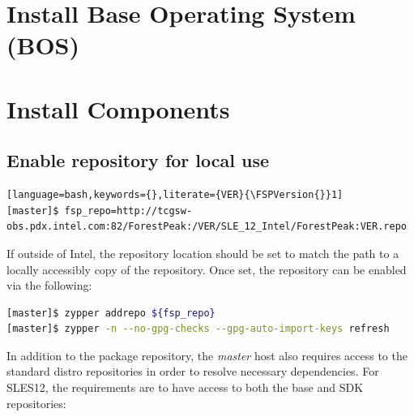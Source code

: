 \documentclass[letterpaper]{article}
\newcommand{\baseOS}{SLES12}
\newcommand{\FSPVersion}{15.42}
\begin{document}






\section{Install Base Operating System (BOS)}



\section{Install \FSP{} Components} \label{sec:basic_install}


\subsection{Enable \FSP{} repository for local use} \label{sec:enable_repo}


\begin{lstlisting}[language=bash,keywords={},literate={VER}{\FSPVersion{}}1]
[master]$ fsp_repo=http://tcgsw-obs.pdx.intel.com:82/ForestPeak:/VER/SLE_12_Intel/ForestPeak:VER.repo
\end{lstlisting}


If outside of Intel, the repository location should be set to match the path to
a locally accessibly copy of the \FSP{} repository. Once set, the repository can be
enabled via the following: 

\begin{lstlisting}[language=bash,keywords={}]
[master]$ zypper addrepo ${fsp_repo}
[master]$ zypper -n --no-gpg-checks --gpg-auto-import-keys refresh
\end{lstlisting}



In addition to the \FSP{} package repository, the {\em master} host also
requires access to the standard distro repositories in order to resolve
necessary dependencies. For \baseOS{}, the requirements are to have access to
both the base and SDK repositories:
\end{document}
